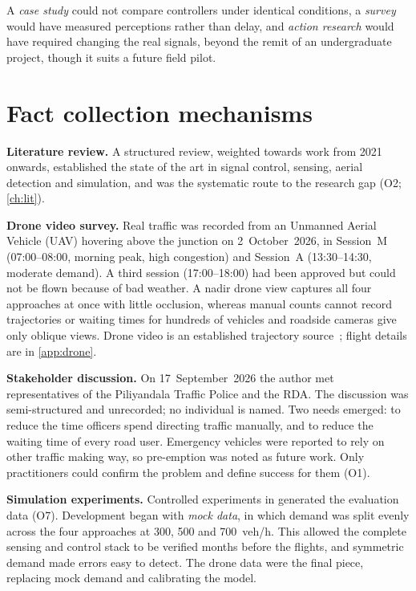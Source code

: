 A \emph{case study} could not compare controllers under identical conditions, a \emph{survey} would have measured perceptions rather than delay, and \emph{action research} would have required changing the real signals, beyond the remit of an undergraduate project, though it suits a future field pilot.

\section{Fact collection mechanisms}\label{sec:method-facts}

\textbf{Literature review.} A structured review, weighted towards work from 2021 onwards, established the state of the art in signal control, sensing, aerial detection and simulation, and was the systematic route to the research gap (O2; \cref{ch:lit}).

\textbf{Drone video survey.} Real traffic was recorded from an Unmanned Aerial Vehicle (UAV) hovering above the junction on 2~October~2026, in Session~M (07:00--08:00, morning peak, high congestion) and Session~A (13:30--14:30, moderate demand). A third session (17:00--18:00) had been approved but could not be flown because of bad weather. A nadir drone view captures all four approaches at once with little occlusion, whereas manual counts cannot record trajectories or waiting times for hundreds of vehicles and roadside cameras give only oblique views. Drone video is an established trajectory source~\cite{krajewski2018highd,barmpounakis2020pneuma}; flight details are in \cref{app:drone}.

\textbf{Stakeholder discussion.} On 17~September~2026 the author met representatives of the Piliyandala Traffic Police and the RDA. The discussion was semi-structured and unrecorded; no individual is named. Two needs emerged: to reduce the time officers spend directing traffic manually, and to reduce the waiting time of every road user. Emergency vehicles were reported to rely on other traffic making way, so pre-emption was noted as future work. Only practitioners could confirm the problem and define success for them (O1).

\textbf{Simulation experiments.} Controlled experiments in \sumo{} generated the evaluation data (O7). Development began with \emph{mock data}, in which demand was split evenly across the four approaches at 300, 500 and 700~veh/h. This allowed the complete sensing and control stack to be verified months before the flights, and symmetric demand made errors easy to detect. The drone data were the final piece, replacing mock demand and calibrating the model.

